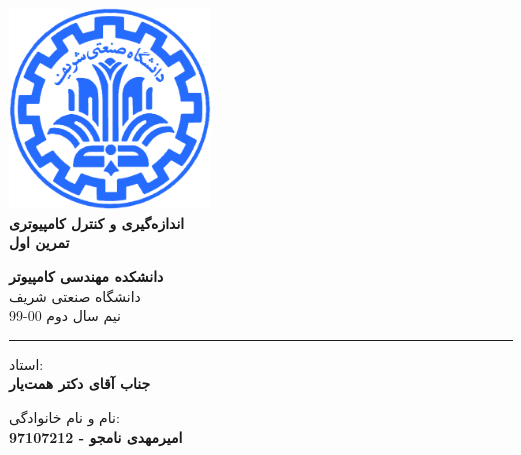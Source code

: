 \documentclass[12pt]{article}
\begin{document}
\begin{titlepage}
\begin{center}
        
\vspace*{0.7cm}

\includegraphics[width=0.4\textwidth]{sharif1.png}\\
\vspace{0.5cm}
\textbf{ \Huge{\emph ‌اندازه‌گیری و کنترل کامپیوتری} }\\
\vspace{0.5cm}
\textbf{ \Large{ تمرین اول} }
\vspace{0.2cm}
       
 
      \large \textbf{دانشکده مهندسی کامپیوتر}\\\vspace{0.2cm}
    \large   دانشگاه صنعتی شریف\\\vspace{0.2cm}
       \large   ﻧﯿﻢ سال دوم 00-99 \\\vspace{0.2cm}
      \noindent\rule[1ex]{\linewidth}{1pt}
استاد:\\
    \textbf{{جناب آقای دکتر همت‌یار}}


    \vspace{0.15cm}
نام و نام خانوادگی:\\

       
    \textbf{{امیرمهدی نامجو - 97107212}}
\end{center}
\end{titlepage}


\newpage
\pagestyle{fancy}
\fancyhf{}
\fancyfoot{}
\cfoot{\thepage}
\end{document}
